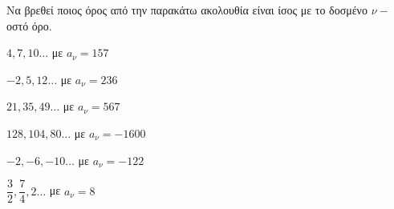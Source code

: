 Να βρεθεί ποιος όρος από την παρακάτω ακολουθία είναι ίσος με το δοσμένο $ \nu- $οστό όρο.
\begin{multicols}{2}
\begin{alist}
\item $ 4,7,10\ldots $ με $ a_{\nu}=157 $
\item $ -2,5,12\ldots $ με $ a_\nu=236 $
\item $ 21,35,49\ldots $ με $ a_\nu=567 $
\item $ 128,104,80\ldots $ με $ a_\nu=-1600 $
\item $ -2,-6,-10\ldots $ με $ a_\nu=-122 $
\item $ \dfrac{3}{2},\dfrac{7}{4},2\ldots $ με $ a_\nu=8 $
\end{alist}
\end{multicols}
